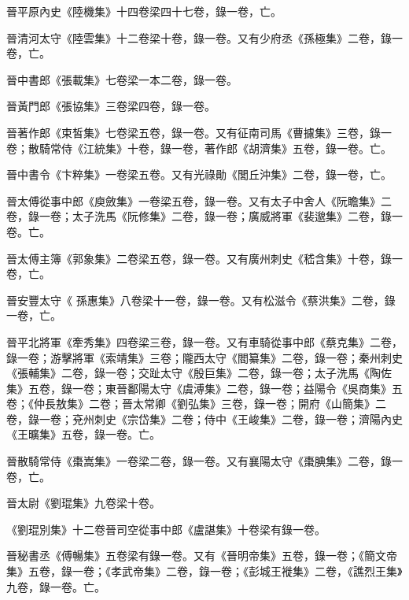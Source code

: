 \begin{pinyinscope}
 晉平原內史《陸機集》十四卷梁四十七卷，錄一卷，亡。



 晉清河太守《陸雲集》十二卷梁十卷，錄一卷。又有少府丞《孫極集》二卷，錄一卷，亡。



 晉中書郎《張載集》七卷梁一本二卷，錄一卷。



 晉黃門郎《張協集》三卷梁四卷，錄一卷。



 晉著作郎《束皙集》七卷梁五卷，錄一卷。又有征南司馬《曹攄集》三卷，錄一卷；散騎常侍《江統集》十卷，錄一卷，著作郎《胡濟集》五卷，錄一卷。亡。



 晉中書令《卞粹集》一卷梁五卷。又有光祿勛《閭丘沖集》二卷，錄一卷，亡。



 晉太傅從事中郎《庾斂集》一卷梁五卷，錄一卷。又有太子中舍人《阮瞻集》二卷，錄一卷；太子洗馬《阮修集》二卷，錄一卷；廣威將軍《裴邈集》二卷，錄一卷。亡。



 晉太傅主簿《郭象集》二卷梁五卷，錄一卷。又有廣州刺史《嵇含集》十卷，錄一卷，亡。



 晉安豐太守《
 孫惠集》八卷梁十一卷，錄一卷。又有松滋令《蔡洪集》二卷，錄一卷，亡。



 晉平北將軍《牽秀集》四卷梁三卷，錄一卷。又有車騎從事中郎《蔡克集》二卷，錄一卷；游擊將軍《索靖集》三卷；隴西太守《閻纂集》二卷，錄一卷；秦州刺史《張輔集》二卷，錄一卷；交趾太守《殷巨集》二卷，錄一卷；太子洗馬《陶佐集》五卷，錄一卷；東晉鄱陽太守《虞溥集》二卷，錄一卷；益陽令《吳商集》五卷；《仲長敖集》二卷；晉太常卿《劉弘集》三卷，錄一卷；開府《山簡集》二卷，錄一卷；兗州刺史《宗岱集》二卷；侍中《王峻集》二卷，錄一卷；濟陽內史《王曠集》五卷，錄一卷。亡。



 晉散騎常侍《棗嵩集》一卷梁二卷，錄一卷。又有襄陽太守《棗腆集》二卷，錄一卷，亡。



 晉太尉《劉琨集》九卷梁十卷。



 《劉琨別集》十二卷晉司空從事中郎《盧諶集》十卷梁有錄一卷。



 晉秘書丞《傅暢集》五卷梁有錄一卷。又有《晉明帝集》五卷，錄一卷；《簡文帝集》五卷，錄一卷；《孝武帝集》二卷，錄一卷；《彭城王褷集》二卷，《譙烈王集》九卷，錄一卷。亡。




\end{pinyinscope}

